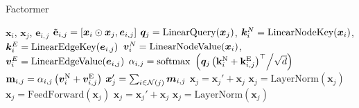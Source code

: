 \documentclass{article}
\begin{document}
\begin{algorithm}[ht]
   \caption{Factormer}
   \label{alg:factormer}
\begin{algorithmic}
    $\mathbf{x}_{i}$, $\mathbf{x}_{j}$, $\mathbf{e}_{i,j}$ \hfill{}
   \STATE $\tilde{\mathbf{e}}_{i,j} = \left[{\bm{x}}_i \odot {\bm{x}}_j, {\bm{e}}_{i,j}\right]$
   \STATE ${\bm{q}}_j = \text{LinearQuery}({\bm{x}}_j)$, ${\bm{k}}_i^N = \text{LinearNodeKey}({\bm{x}}_i)$, ${\bm{k}}_i^E = \text{LinearEdgeKey}({\bm{e}}_{i,j})$
   \STATE  ${\bm{v}}_i^N = \text{LinearNodeValue}({\bm{x}}_i)$, ${\bm{v}}_i^E=\text{LinearEdgeValue}({\bm{e}}_{i,j})$
   \STATE $\alpha_{i,j} = \text{softmax }\left({\bm{q}}_j\left( \mathbf{k}_i^\text{N} + \mathbf{k}_{i,j}^\text{E} \right )^\top   \middle/ \sqrt{d}\right)$ \hfill{}
   \STATE $\mathbf{m}_{i,j} = \alpha_{i,j} \left ( {\bm{v}}_i^\text{N} + {\bm{v}}_{i,j}^\text{E}\right )$\hfill{}
    \STATE ${\bm{x}}_j' =\sum_{i\in\mathcal{N}(j)} {\bm{m}}_{i,j} $ \hfill{}
   \STATE $\mathbf{x}_j =\mathbf{x}_j' + \mathbf{x}_j$
   \STATE $\mathbf{x}_j = \text{LayerNorm}(\mathbf{x}_j)$
    \STATE $\mathbf{x}_j =\text{FeedForward}(\mathbf{x}_j)$
   \STATE $\mathbf{x}_j =\mathbf{x}_j' + \mathbf{x}_j$
    \STATE $\mathbf{x}_j = \text{LayerNorm}(\mathbf{x}_j)$\hfill{}
    \ENDIF
\end{algorithmic}
\end{algorithm}
\end{document}
